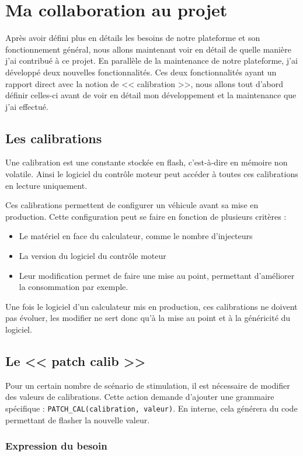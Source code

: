 \chapter{Ma collaboration au projet}\label{collab}
\putminitoc
Après avoir défini plus en détails les besoins de notre plateforme et son fonctionnement général, nous allons maintenant voir en détail de quelle manière j'ai contribué à ce projet. En parallèle de la maintenance de notre plateforme, j'ai développé deux nouvelles fonctionnalités. Ces deux fonctionnalités ayant un rapport direct avec la notion de << calibration >>, nous allons tout d'abord définir celles-ci avant de voir en détail mon développement et la maintenance que j'ai effectué.

\section{Les calibrations}
Une calibration est une constante stockée en flash, c'est-à-dire en mémoire non volatile. Ainsi le logiciel du contrôle moteur peut accéder à toutes ces calibrations en lecture uniquement.

Ces calibrations permettent de configurer un véhicule avant sa mise en production. Cette configuration peut se faire en fonction de plusieurs critères : 
\begin{itemize}
	\item Le matériel en face du calculateur, comme le nombre d'injecteurs
	\item La version du logiciel du contrôle moteur
	\item Leur modification permet de faire une mise au point, permettant d'améliorer la consommation par exemple.
\end{itemize}

Une fois le logiciel d'un calculateur mis en production, ces calibrations ne doivent pas évoluer, les modifier ne sert donc qu'à la mise au point et à la généricité du logiciel.

\section{Le << patch calib >>}\label{patch}
Pour un certain nombre de scénario de stimulation, il est nécessaire de modifier des valeurs de calibrations. Cette action demande d'ajouter une grammaire spécifique : \texttt{PATCH\_CAL(calibration, valeur)}. En interne, cela générera du code permettant de flasher la nouvelle valeur.

\subsection{Expression du besoin}\label{besoinArray}
